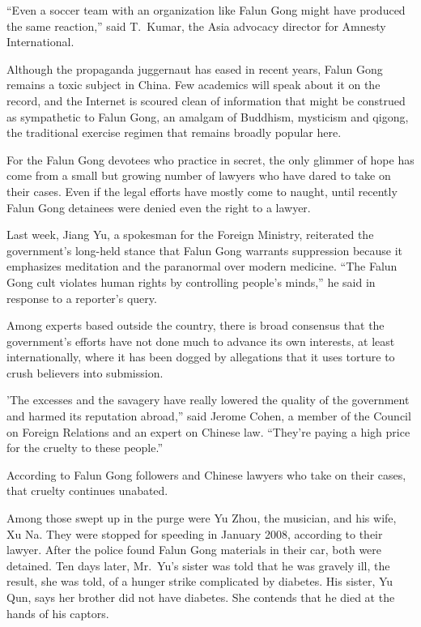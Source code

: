 \documentclass[12pt,a4paper,onecolumn]{article}
\begin{document}
``Even a soccer team with an organization like Falun Gong might have produced the same reaction,''
said T.~Kumar, the Asia advocacy director for Amnesty International.

Although the propaganda juggernaut has eased in recent years, Falun Gong remains a toxic subject in
China. Few academics will speak about it on the record, and the Internet is scoured clean of
information that might be construed as sympathetic to Falun Gong, an amalgam of Buddhism, mysticism
and qigong, the traditional exercise regimen that remains broadly popular here.

For the Falun Gong devotees who practice in secret, the only glimmer of hope has come from a small
but growing number of lawyers who have dared to take on their cases. Even if the legal efforts have
mostly come to naught, until recently Falun Gong detainees were denied even the right to a lawyer.

Last week, Jiang Yu, a spokesman for the Foreign Ministry, reiterated the government's long-held
stance that Falun Gong warrants suppression because it emphasizes meditation and the paranormal over
modern medicine. ``The Falun Gong cult violates human rights by controlling people's minds,'' he
said in response to a reporter's query.

Among experts based outside the country, there is broad consensus that the government's efforts have
not done much to advance its own interests, at least internationally, where it has been dogged by
allegations that it uses torture to crush believers into submission.

'The excesses and the savagery have really lowered the quality of the government and harmed its
reputation abroad,'' said Jerome Cohen, a member of the Council on Foreign Relations and an expert
on Chinese law. ``They're paying a high price for the cruelty to these people.''

According to Falun Gong followers and Chinese lawyers who take on their cases, that cruelty
continues unabated.

Among those swept up in the purge were Yu Zhou, the musician, and his wife, Xu Na. They were stopped
for speeding in January 2008, according to their lawyer. After the police found Falun Gong materials
in their car, both were detained. Ten days later, Mr.~Yu's sister was told that he was gravely ill,
the result, she was told, of a hunger strike complicated by diabetes. His sister, Yu Qun, says her
brother did not have diabetes. She contends that he died at the hands of his captors.
\end{document}
